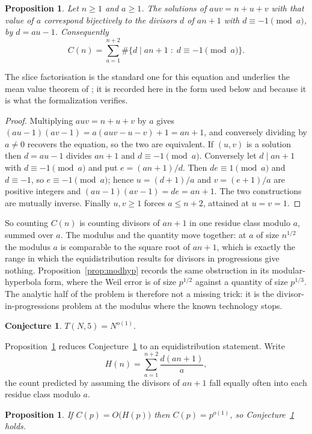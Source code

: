 \documentclass[11pt]{article}
\theoremstyle{plain}
\newtheorem{proposition}[theorem]{Proposition}
\theoremstyle{definition}
\newtheorem{conjecture}[theorem]{Conjecture}
\begin{document}
\begin{proposition}\label{prop:sliceform}
Let $n\ge1$ and $a\ge1$. The solutions of $auv=n+u+v$ with that value of $a$ correspond
bijectively to the divisors $d$ of $an+1$ with $d\equiv-1\pmod a$, by $d=au-1$. Consequently
\[
  C(n)=\sum_{a=1}^{n+2}\#\{d\mid an+1 \;:\; d\equiv-1 \pmod a\}.
\]
\end{proposition}

The slice factorisation is the standard one for this equation and underlies the mean value
theorem of \cite{Huang}; it is recorded here in the form used below and because it is what
the formalization verifies.

\begin{proof}
Multiplying $auv=n+u+v$ by $a$ gives $(au-1)(av-1)=a(auv-u-v)+1=an+1$, and conversely
dividing by $a\neq0$ recovers the equation, so the two are equivalent. If $(u,v)$ is a
solution then $d=au-1$ divides $an+1$ and $d\equiv-1\pmod a$. Conversely let
$d\mid an+1$ with $d\equiv-1\pmod a$ and put $e=(an+1)/d$. Then $de\equiv1\pmod a$ and
$d\equiv-1$, so $e\equiv-1\pmod a$; hence $u=(d+1)/a$ and $v=(e+1)/a$ are positive integers
and $(au-1)(av-1)=de=an+1$. The two constructions are mutually inverse. Finally $u,v\ge1$
forces $a\le n+2$, attained at $u=v=1$.
\end{proof}

So counting $C(n)$ is counting divisors of $an+1$ in one residue class modulo $a$, summed
over $a$. The modulus and the quantity move together: at $a$ of size $n^{1/2}$ the modulus
$a$ is comparable to the square root of $an+1$, which is exactly the range in which the
equidistribution results for divisors in progressions give nothing. Proposition~\ref{prop:modhyp}
records the same obstruction in its modular-hyperbola form, where the Weil error is of size
$p^{1/2}$ against a quantity of size $p^{1/3}$. The analytic half of the problem is therefore
not a missing trick: it is the divisor-in-progressions problem at the modulus where the known
technology stops.

\begin{conjecture}\label{conj:order}
$T(N,5)=N^{o(1)}$.
\end{conjecture}

Proposition~\ref{prop:sliceform} reduces Conjecture~\ref{conj:order} to an equidistribution
statement. Write
\[
  H(n)=\sum_{a=1}^{n+2}\frac{d(an+1)}{a},
\]
the count predicted by assuming the divisors of $an+1$ fall equally often into each residue
class modulo $a$.

\begin{proposition}\label{prop:equidist}
If $C(p)=O\bigl(H(p)\bigr)$ then $C(p)=p^{o(1)}$, so Conjecture~\ref{conj:order} holds.
\end{proposition}
\end{document}
